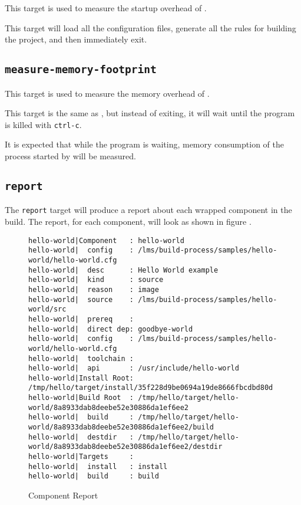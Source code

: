 This target is used to measure the startup overhead of \lmsbw.

This target will load all the configuration files, generate all the
rules for building the project, and then immediately exit.

\subsection{\texttt{measure-memory-footprint}}

This target is used to measure the memory overhead of \lmsbw.

This target is the same as , but
instead of exiting, it will wait until the program is killed with
\texttt{ctrl-c}.

It is expected that while the program is waiting, memory consumption
of the \make process started by \lmsbw will be measured.

\subsection{\texttt{report}}\label{usinglmsbw:report}

The \texttt{report} target will produce a report about each wrapped
component in the build.  The report, for each component, will look
as shown in figure .

\begin{landscape}
\begin{figure}
\hrulefill
\begin{small}
\begin{verbatim}
hello-world|Component   : hello-world
hello-world|  config    : /lms/build-process/samples/hello-world/hello-world.cfg
hello-world|  desc      : Hello World example
hello-world|  kind      : source
hello-world|  reason    : image
hello-world|  source    : /lms/build-process/samples/hello-world/src
hello-world|  prereq    :
hello-world|  direct dep: goodbye-world
hello-world|  config    : /lms/build-process/samples/hello-world/hello-world.cfg
hello-world|  toolchain :
hello-world|  api       : /usr/include/hello-world
hello-world|Install Root: /tmp/hello/target/install/35f228d9be0694a19de8666fbcdbd80d
hello-world|Build Root  : /tmp/hello/target/hello-world/8a8933dab8deebe52e30886da1ef6ee2
hello-world|  build     : /tmp/hello/target/hello-world/8a8933dab8deebe52e30886da1ef6ee2/build
hello-world|  destdir   : /tmp/hello/target/hello-world/8a8933dab8deebe52e30886da1ef6ee2/destdir
hello-world|Targets     :
hello-world|  install   : install
hello-world|  build     : build
\end{verbatim}
\end{small}
\hrulefill
\caption{Component Report}\label{usinglmsbw:component-report}
\end{figure}
\end{landscape}

